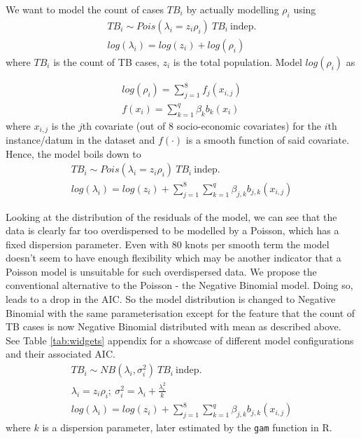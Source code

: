 We want to model the count of cases $TB_i$ by actually modelling $\rho_i$ using
$$
\begin{aligned}
	TB_i \sim Pois(\lambda_i = z_i \rho_i) \ TB_i\  \mathrm{indep.} 
	\\
	log(\lambda_i) = log(z_i) + log(\rho_i)
\end{aligned}
$$
where $TB_i$ is the count of TB cases, $z_i$ is the total population. Model $log(\rho_i)$ as

$$
\begin{aligned}
	log(\rho_i) = \sum_{j=1}^{8}f_{j}(x_{i,j})
	\\
	f(x_i) = \sum_{k=1}^{q}\beta_{k}b_{k}(x_i)
\end{aligned}
$$
where $x_{i,j}$ is the $j$th covariate (out of 8 socio-economic covariates) for the $i$th instance/datum in the dataset and $f(\cdot)$ is a smooth function of said covariate. Hence, the model boils down to
$$
\begin{aligned}
	TB_i \sim Pois(\lambda_i = z_i \rho_i) \ TB_i\  \mathrm{indep.} 
	\\
	log(\lambda_i) = log(z_i) +  \sum_{j=1}^{8}\sum_{k=1}^{q}\beta_{j,k}b_{j,k}(x_{i,j})
\end{aligned}
$$

Looking at the distribution of the residuals of the model, we can see that the data is clearly far too overdispersed to be modelled by a Poisson, which has a fixed dispersion parameter. Even with 80 knots per smooth term the model doesn't seem to have enough flexibility which may be another indicator that a Poisson model is unsuitable for such overdispersed data. We propose the conventional alternative to the Poisson - the Negative Binomial model. Doing so, leads to a drop in the AIC. So the model distribution is changed to Negative Binomial with the same parameterisation except for
the feature that the count of TB cases is now Negative Binomial distributed with mean as described above.
See Table \ref{tab:widgets} appendix for a showcase of different model configurations and their associated AIC.
$$
\begin{aligned}
	TB_i \sim NB(\lambda_i , \sigma_i^2) \ TB_i\  \mathrm{indep.} 
	\\
	\lambda_i = z_i \rho_i ;\ \sigma_i^2 = \lambda_i +\frac{\lambda_i^2}{k}
	\\
	log(\lambda_i) = log(z_i) +  \sum_{j=1}^{8}\sum_{k=1}^{q}\beta_{j,k}b_{j,k}(x_{i,j})
\end{aligned}
$$
where $k$ is a dispersion parameter, later estimated by  the  \texttt{gam} function in R.
\newline

